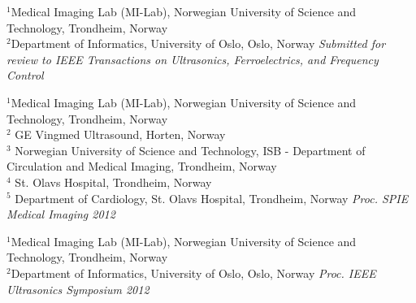 \documentclass[10pt,b5paper,twoside]{book}
\begin{document}
\begin{bibunit}[ieeetr]
{
	$^{1}$Medical Imaging Lab (MI-Lab), Norwegian University of Science and Technology, Trondheim, Norway\\
    	$^{2}$Department of Informatics, University of Oslo, Oslo, Norway
}
\noindent \textit{Submitted for review to IEEE Transactions on Ultrasonics, Ferroelectrics, and Frequency Control}
%
\newpage{}
\putbib[bibSTBandAb]
\end{bibunit}


\begin{bibunit}[ieeetr]
{
$^{1}$Medical Imaging Lab (MI-Lab), Norwegian University of Science and Technology, Trondheim, Norway\\
$^{2}$ GE Vingmed Ultrasound, Horten, Norway\\
$^{3}$ Norwegian University of Science and Technology, ISB - Department of Circulation and Medical Imaging, Trondheim, Norway\\
$^{4}$ St. Olavs Hospital, Trondheim, Norway\\
$^{5}$ Department of Cardiology, St. Olavs Hospital, Trondheim, Norway
}
\noindent \textit{Proc. SPIE Medical Imaging 2012}
%
\newpage{}
\putbib[bibSPTD]
\end{bibunit}

\begin{bibunit}[ieeetr]
{
	$^{1}$Medical Imaging Lab (MI-Lab), Norwegian University of Science and Technology, Trondheim, Norway\\
    	$^{2}$Department of Informatics, University of Oslo, Oslo, Norway
}
\noindent \textit{Proc. IEEE Ultrasonics Symposium 2012}
%
\newpage{}
\putbib[bibSPTD]
\end{bibunit}

\appendix
\end{document}
